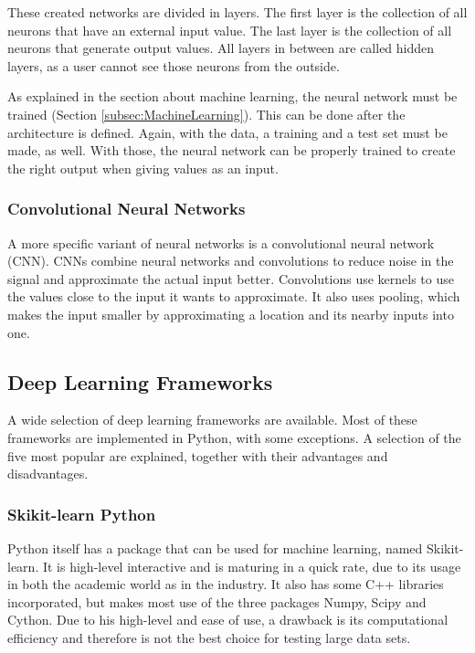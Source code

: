 \documentclass[10pt,a4paper]{article}
\begin{document}
	These created networks are divided in layers. The first layer is the 
	collection of all neurons that have an external input value. The last layer 
	is the collection of all neurons that generate output values. All layers in 
	between are called hidden layers, as a user cannot see those neurons from 
	the outside.\cite{Wang2003}
	
	As explained in the section about machine learning, the neural network must 
	be trained (Section \ref{subsec:MachineLearning}). This can be done after 
	the architecture is defined. Again, with the data, a training and a test 
	set must be made, as well. With those, the neural network can be properly 
	trained to create the right output when giving values as an input. 
	\cite{Wang2003}
	
	\subsubsection{Convolutional Neural Networks}
	
	A more specific variant of neural networks is a convolutional neural 
	network (CNN). CNNs combine neural networks and convolutions to reduce 
	noise in the signal and approximate the actual input better. Convolutions 
	use kernels to use the values close to the input it wants to approximate. 
	It also uses pooling, which makes the input smaller by approximating a 
	location and its nearby inputs into one. \cite{Goodfellow-et-al-2016}
	
	\clearpage
	
	\subsection{Deep Learning Frameworks}
	
	A wide selection of deep learning frameworks are available. Most of these 
	frameworks are implemented in Python, with some exceptions. A selection of 
	the five most popular are explained, together with their advantages and 
	disadvantages.
	
	\subsubsection{Skikit-learn Python}
	
	Python itself has a package that can be used for machine learning, named 
	Skikit-learn. It is high-level interactive and is maturing in a quick rate, 
	due to its usage in both the academic world as in the industry. It also has 
	some C++ libraries incorporated, but makes most use of the three packages 
	Numpy, Scipy and Cython. Due to his high-level and ease of use, a drawback 
	is its computational efficiency and therefore is not the best choice for 
	testing large data sets.\cite{pedregosa2011scikit}
	
\end{document}

